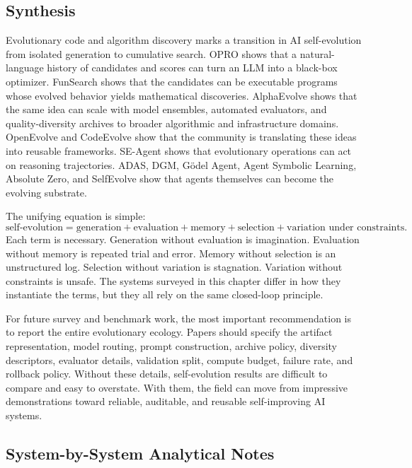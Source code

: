 \subsection{Synthesis}
\label{subsec:evolution-synthesis}

Evolutionary code and algorithm discovery marks a transition in AI self-evolution from isolated generation to cumulative search.  OPRO shows that a natural-language history of candidates and scores can turn an LLM into a black-box optimizer.  FunSearch shows that the candidates can be executable programs whose evolved behavior yields mathematical discoveries.  AlphaEvolve shows that the same idea can scale with model ensembles, automated evaluators, and quality-diversity archives to broader algorithmic and infrastructure domains.  OpenEvolve and CodeEvolve show that the community is translating these ideas into reusable frameworks.  SE-Agent shows that evolutionary operations can act on reasoning trajectories.  ADAS, DGM, G{\"o}del Agent, Agent Symbolic Learning, Absolute Zero, and SelfEvolve show that agents themselves can become the evolving substrate.

The unifying equation is simple:
\begin{equation}
  \text{self-evolution} = \text{generation} + \text{evaluation} + \text{memory} + \text{selection} + \text{variation under constraints}.
\end{equation}
Each term is necessary.  Generation without evaluation is imagination.  Evaluation without memory is repeated trial and error.  Memory without selection is an unstructured log.  Selection without variation is stagnation.  Variation without constraints is unsafe.  The systems surveyed in this chapter differ in how they instantiate the terms, but they all rely on the same closed-loop principle.

For future survey and benchmark work, the most important recommendation is to report the entire evolutionary ecology.  Papers should specify the artifact representation, model routing, prompt construction, archive policy, diversity descriptors, evaluator details, validation split, compute budget, failure rate, and rollback policy.  Without these details, self-evolution results are difficult to compare and easy to overstate.  With them, the field can move from impressive demonstrations toward reliable, auditable, and reusable self-improving AI systems.


\subsection{System-by-System Analytical Notes}
\label{subsec:evolution-system-notes}

